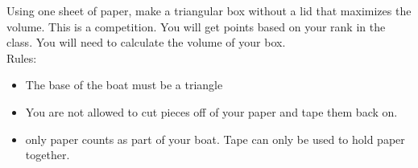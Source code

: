 \documentclass[11pt]{exam}
\begin{document}
\begin{questions}
		\question[5] Using one sheet of paper, make a triangular box without a lid that maximizes the volume.  This is a competition.  You will get points based on your rank in the class.  You will need to calculate the volume of your box.\\
		
		Rules:
		\begin{itemize}
			\item The base of the boat must be a triangle
			\item You are not allowed to cut pieces off of your paper and tape them back on.
			\item only paper counts as part of your boat.  Tape can only be used to hold paper together.
		\end{itemize}
		
		
	\end{questions}
	
\end{document}
